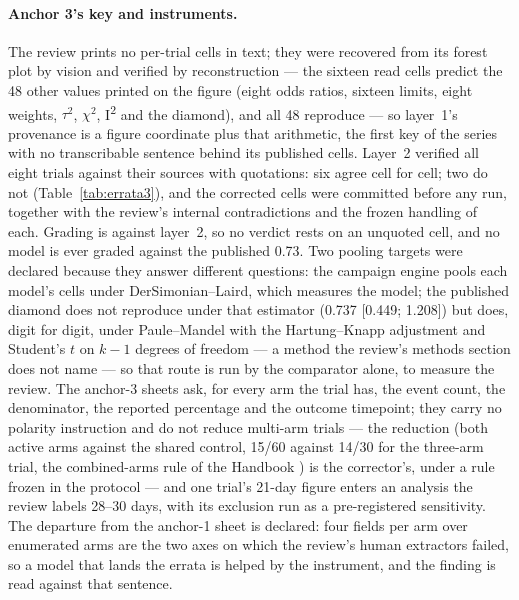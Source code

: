 \documentclass[11pt]{article}
\begin{document}
\paragraph{Anchor 3's key and instruments.} The review prints no per-trial cells in text; they were recovered from its forest plot by vision and verified by reconstruction --- the sixteen read cells predict the 48 other values printed on the figure (eight odds ratios, sixteen limits, eight weights, $\tau^2$, $\chi^2$, I\textsuperscript{2} and the diamond), and all 48 reproduce --- so layer~1's provenance is a figure coordinate plus that arithmetic, the first key of the series with no transcribable sentence behind its published cells. Layer~2 verified all eight trials against their sources with quotations: six agree cell for cell; two do not (Table~\ref{tab:errata3}), and the corrected cells were committed before any run, together with the review's internal contradictions and the frozen handling of each. Grading is against layer~2, so no verdict rests on an unquoted cell, and no model is ever graded against the published 0.73. Two pooling targets were declared because they answer different questions: the campaign engine pools each model's cells under DerSimonian--Laird, which measures the model; the published diamond does not reproduce under that estimator (0.737 [0.449; 1.208]) but does, digit for digit, under Paule--Mandel with the Hartung--Knapp adjustment and Student's $t$ on $k-1$ degrees of freedom \citep{veroniki2016tau,inthout2014hksj} --- a method the review's methods section does not name --- so that route is run by the comparator alone, to measure the review. The anchor-3 sheets ask, for every arm the trial has, the event count, the denominator, the reported percentage and the outcome timepoint; they carry no polarity instruction and do not reduce multi-arm trials --- the reduction (both active arms against the shared control, 15/60 against 14/30 for the three-arm trial, the combined-arms rule of the Handbook \citep{higgins2023handbook}) is the corrector's, under a rule frozen in the protocol --- and one trial's 21-day figure enters an analysis the review labels 28--30 days, with its exclusion run as a pre-registered sensitivity. The departure from the anchor-1 sheet is declared: four fields per arm over enumerated arms are the two axes on which the review's human extractors failed, so a model that lands the errata is helped by the instrument, and the finding is read against that sentence.
\end{document}
